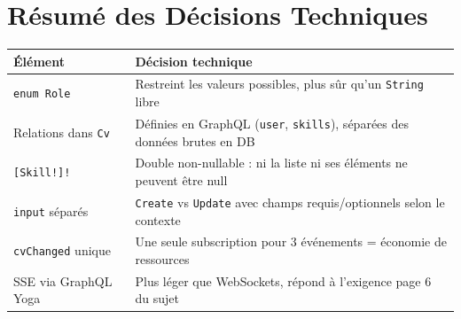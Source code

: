 \documentclass[12pt,a4paper]{article}
\begin{document}
\section{Résumé des Décisions Techniques}

\begin{center}
\begin{tabular}{@{}lp{9cm}@{}}
\toprule
\textbf{Élément} & \textbf{Décision technique} \\
\midrule
\texttt{enum Role}       & Restreint les valeurs possibles, plus sûr qu'un \texttt{String} libre \\
Relations dans \texttt{Cv} & Définies en GraphQL (\texttt{user}, \texttt{skills}), séparées des données brutes en DB \\
\texttt{[Skill!]!}       & Double non-nullable : ni la liste ni ses éléments ne peuvent être null \\
\texttt{input} séparés   & \texttt{Create} vs \texttt{Update} avec champs requis/optionnels selon le contexte \\
\texttt{cvChanged} unique & Une seule subscription pour 3 événements = économie de ressources \\
SSE via GraphQL Yoga     & Plus léger que WebSockets, répond à l'exigence page 6 du sujet \\
\bottomrule
\end{tabular}
\end{center}
\end{document}
